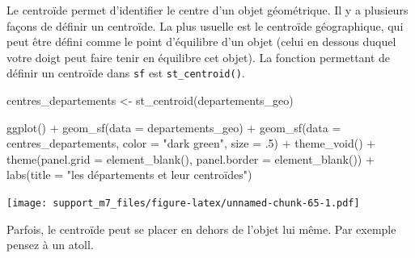 \documentclass[
]{book}
\newenvironment{Shaded}{\begin{snugshade}}{\end{snugshade}}
\newcommand{\AttributeTok}[1]{\textcolor[rgb]{0.77,0.63,0.00}{#1}}
\newcommand{\DecValTok}[1]{\textcolor[rgb]{0.00,0.00,0.81}{#1}}
\newcommand{\FunctionTok}[1]{\textcolor[rgb]{0.00,0.00,0.00}{#1}}
\newcommand{\NormalTok}[1]{#1}
\newcommand{\OtherTok}[1]{\textcolor[rgb]{0.56,0.35,0.01}{#1}}
\newcommand{\SpecialCharTok}[1]{\textcolor[rgb]{0.00,0.00,0.00}{#1}}
\newcommand{\StringTok}[1]{\textcolor[rgb]{0.31,0.60,0.02}{#1}}
\begin{document}
Le centroïde permet d'identifier le centre d'un objet géométrique. Il y a plusieurs façons de définir un centroïde. La plus usuelle est le centroïde géographique, qui peut être défini comme le point d'équilibre d'un objet (celui en dessous duquel votre doigt peut faire tenir en équilibre cet objet).
La fonction permettant de définir un centroïde dans \texttt{sf} est \texttt{st\_centroid()}.

\begin{Shaded}
\begin{Highlighting}[]
\NormalTok{centres\_departements }\OtherTok{\textless{}{-}} \FunctionTok{st\_centroid}\NormalTok{(departements\_geo)}
\end{Highlighting}
\end{Shaded}

\begin{Shaded}
\begin{Highlighting}[]
\FunctionTok{ggplot}\NormalTok{() }\SpecialCharTok{+}
  \FunctionTok{geom\_sf}\NormalTok{(}\AttributeTok{data =}\NormalTok{ departements\_geo) }\SpecialCharTok{+}
  \FunctionTok{geom\_sf}\NormalTok{(}\AttributeTok{data =}\NormalTok{ centres\_departements, }\AttributeTok{color =} \StringTok{"dark green"}\NormalTok{, }\AttributeTok{size =}\NormalTok{ .}\DecValTok{5}\NormalTok{) }\SpecialCharTok{+}
  \FunctionTok{theme\_void}\NormalTok{() }\SpecialCharTok{+}
  \FunctionTok{theme}\NormalTok{(}\AttributeTok{panel.grid =} \FunctionTok{element\_blank}\NormalTok{(), }\AttributeTok{panel.border =} \FunctionTok{element\_blank}\NormalTok{()) }\SpecialCharTok{+}
  \FunctionTok{labs}\NormalTok{(}\AttributeTok{title =} \StringTok{"les départements et leur centroïdes"}\NormalTok{)}
\end{Highlighting}
\end{Shaded}

\texttt{[image: support\_m7\_files/figure-latex/unnamed-chunk-65-1.pdf]}

Parfois, le centroïde peut se placer en dehors de l'objet lui même. Par exemple pensez à un atoll.
\end{document}
